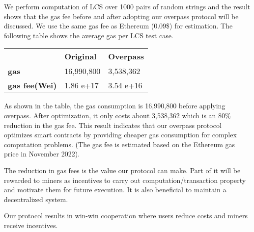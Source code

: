 We perform computation of LCS over 1000 pairs of random strings and the result shows that the gas fee before and after adopting our overpass protocol will be discussed. We use the same gas fee as Ethereum (0.09\$) for estimation. The following table shows the average gas per LCS test case. 
\begin{table}[H]
\begin{tabular}{|l|l|l|}
\hline
                      & Original   & Overpass  \\ \hline
\textbf{gas}          & 16,990,800 & 3,538,362 \\ \hline
\textbf{gas fee(Wei)} & 1.86 e+17  & 3.54 e+16 \\ \hline
\end{tabular}
\end{table}
As shown in the table, the gas consumption is 16,990,800 before applying overpass. After optimization, it only costs about 3,538,362 which is an 80\% reduction in the gas fee. This result indicates that our overpass protocol optimizes smart contracts by providing cheaper gas consumption for complex computation problems. (The gas fee is estimated based on the Ethereum gas price in November 2022).

The reduction in gas fees is the value our protocol can make. Part of it will be rewarded to miners as incentives to carry out computation/transaction property and motivate them for future execution. It is also beneficial to maintain a decentralized system. 

Our protocol results in win-win cooperation where users reduce costs and miners receive incentives. 
